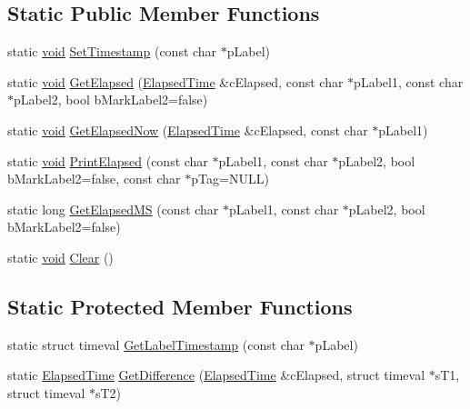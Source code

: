 \subsection*{\-Static \-Public \-Member \-Functions}
\begin{DoxyCompactItemize}
\item 
static \hyperlink{_cpclient_8h_a6464f7480a0fd0ee170cba12b2c0497f}{void} \hyperlink{class_c_profile_timer_a46d890dae6ed61d728fecde8a68ead61}{\-Set\-Timestamp} (const char $\ast$p\-Label)
\item 
static \hyperlink{_cpclient_8h_a6464f7480a0fd0ee170cba12b2c0497f}{void} \hyperlink{class_c_profile_timer_a45d63f2f6b9a92a5e7069cef9a402d38}{\-Get\-Elapsed} (\hyperlink{class_elapsed_time}{\-Elapsed\-Time} \&c\-Elapsed, const char $\ast$p\-Label1, const char $\ast$p\-Label2, bool b\-Mark\-Label2=false)
\item 
static \hyperlink{_cpclient_8h_a6464f7480a0fd0ee170cba12b2c0497f}{void} \hyperlink{class_c_profile_timer_a2a4035c04b45fbb802d09fd4643fd6b5}{\-Get\-Elapsed\-Now} (\hyperlink{class_elapsed_time}{\-Elapsed\-Time} \&c\-Elapsed, const char $\ast$p\-Label1)
\item 
static \hyperlink{_cpclient_8h_a6464f7480a0fd0ee170cba12b2c0497f}{void} \hyperlink{class_c_profile_timer_a79631bee05a1a67ed38bcaf32c24da7a}{\-Print\-Elapsed} (const char $\ast$p\-Label1, const char $\ast$p\-Label2, bool b\-Mark\-Label2=false, const char $\ast$p\-Tag=\-N\-U\-L\-L)
\item 
static long \hyperlink{class_c_profile_timer_a8375a594f2842375b5c53755c1c0ce1d}{\-Get\-Elapsed\-M\-S} (const char $\ast$p\-Label1, const char $\ast$p\-Label2, bool b\-Mark\-Label2=false)
\item 
static \hyperlink{_cpclient_8h_a6464f7480a0fd0ee170cba12b2c0497f}{void} \hyperlink{class_c_profile_timer_ae4f2f0a7f4b60a7fbf1316da4021c59b}{\-Clear} ()
\end{DoxyCompactItemize}
\subsection*{\-Static \-Protected \-Member \-Functions}
\begin{DoxyCompactItemize}
\item 
static struct timeval \hyperlink{class_c_profile_timer_a4d38b3a9eaa88823dadb431760140569}{\-Get\-Label\-Timestamp} (const char $\ast$p\-Label)
\item 
static \hyperlink{class_elapsed_time}{\-Elapsed\-Time} \hyperlink{class_c_profile_timer_a89f47c18a0f65740fcb6939646b99978}{\-Get\-Difference} (\hyperlink{class_elapsed_time}{\-Elapsed\-Time} \&c\-Elapsed, struct timeval $\ast$s\-T1, struct timeval $\ast$s\-T2)
\end{DoxyCompactItemize}

